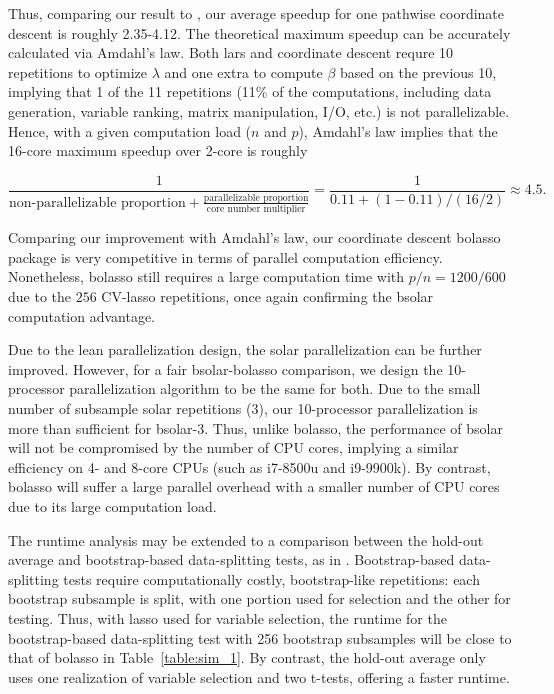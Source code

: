 \documentclass[11pt,authoryear]{elsarticle}
\begin{document}
Thus, comparing our result to \citet{friedman2010regularization}, our average speedup for one pathwise coordinate descent is roughly 2.35-4.12. The theoretical maximum speedup can be accurately calculated via Amdahl's law. Both lars and coordinate descent requre 10 repetitions to optimize $\lambda$ and one extra to compute $\beta$ based on the previous 10, implying that 1 of the 11 repetitions (11\% of the computations, including data generation, variable ranking, matrix manipulation, I/O, etc.) is not parallelizable. Hence, with a given computation load ($n$ and $p$), Amdahl's law implies that the 16-core maximum speedup over 2-core is roughly

\begin{equation}
  \frac{1}{\mbox{non-parallelizable proportion} + \frac{\mbox{parallelizable proportion}}{\mbox{core number multiplier}}} = \frac{1}{0.11 + (1-0.11)/(16/2)} \approx 4.5.
\end{equation}

\noindent
Comparing our improvement with Amdahl's law, our coordinate descent bolasso package is very competitive in terms of parallel computation efficiency. Nonetheless, bolasso still requires a large computation time with $p/n=1200/600$ due to the $256$ CV-lasso repetitions, once again confirming the bsolar computation advantage.

Due to the lean parallelization design, the solar parallelization can be further improved. However, for a fair bsolar-bolasso comparison, we design the 10-processor parallelization algorithm to be the same for both. Due to the small number of subsample solar repetitions (3), our 10-processor parallelization is more than sufficient for bsolar-3. Thus, unlike bolasso, the performance of bsolar will not be compromised by the number of CPU cores, implying a similar efficiency on 4- and 8-core CPUs (such as i7-8500u and i9-9900k). By contrast, bolasso will suffer a large parallel overhead with a smaller number of CPU cores due to its large computation load.

The runtime analysis may be extended to a comparison between the hold-out average and bootstrap-based data-splitting tests, as in \citet{meinshausen2009p}. Bootstrap-based data-splitting tests require computationally costly, bootstrap-like repetitions: each bootstrap subsample is split, with one portion used for selection and the other for testing. Thus, with lasso used for variable selection, the runtime for the bootstrap-based data-splitting test with 256 bootstrap subsamples will be close to that of bolasso in Table~\ref{table:sim_1}. By contrast, the hold-out average only uses one realization of variable selection and two t-tests, offering a faster runtime.
\end{document}
